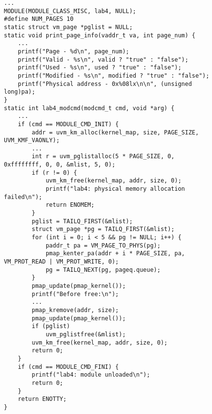 \documentclass[a4paper, 14pt]{extarticle}
\begin{document}
\begin{figure}[!htb]
\begin{lstlisting}[language={},caption={
lab4.c (NetBSD).},label={lst:code2}]
...
MODULE(MODULE_CLASS_MISC, lab4, NULL);
#define NUM_PAGES 10
static struct vm_page *pglist = NULL;
static void print_page_info(vaddr_t va, int page_num) {
    ...
    printf("Page - %d\n", page_num);
    printf("Valid - %s\n", valid ? "true" : "false");
    printf("Used - %s\n", used ? "true" : "false");
    printf("Modified - %s\n", modified ? "true" : "false");
    printf("Physical address - 0x%08lx\n\n", (unsigned long)pa);
}
static int lab4_modcmd(modcmd_t cmd, void *arg) {
    ...
    if (cmd == MODULE_CMD_INIT) {
        addr = uvm_km_alloc(kernel_map, size, PAGE_SIZE, UVM_KMF_VAONLY);
        ...
        int r = uvm_pglistalloc(5 * PAGE_SIZE, 0, 0xffffffff, 0, 0, &mlist, 5, 0);
        if (r != 0) {
            uvm_km_free(kernel_map, addr, size, 0);
            printf("lab4: physical memory allocation failed\n");
            return ENOMEM;
        }
        pglist = TAILQ_FIRST(&mlist); 
        struct vm_page *pg = TAILQ_FIRST(&mlist);
        for (int i = 0; i < 5 && pg != NULL; i++) {
            paddr_t pa = VM_PAGE_TO_PHYS(pg);
            pmap_kenter_pa(addr + i * PAGE_SIZE, pa, VM_PROT_READ | VM_PROT_WRITE, 0);
            pg = TAILQ_NEXT(pg, pageq.queue);
        }
        pmap_update(pmap_kernel());
        printf("Before free:\n");
        ...
        pmap_kremove(addr, size);
        pmap_update(pmap_kernel());
        if (pglist)
            uvm_pglistfree(&mlist);
        uvm_km_free(kernel_map, addr, size, 0);
        return 0;
    }
    if (cmd == MODULE_CMD_FINI) {
        printf("lab4: module unloaded\n");
        return 0;
    }
    return ENOTTY;
}


\end{lstlisting}
\end{figure}


\newpage
\end{document}
